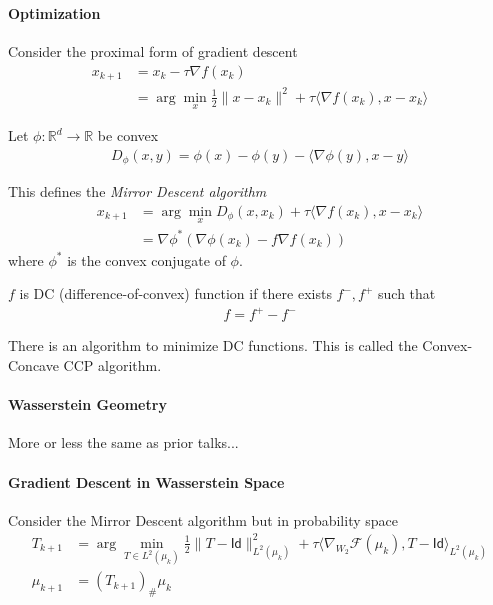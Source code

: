 \documentclass[11pt,fleqn]{article}
\numberwithin{equation}{section}
\theoremstyle{definition}
\theoremstyle{definition}
\begin{document}
\newpage
\section{}
\paragraph{Optimization}
Consider the proximal form of gradient descent
\begin{align}
	x_{k+1} & = x_k - \tau \nabla f(x_k)\\
	& = \arg \min_{x} \frac{1}{2}\|x - x_k\|^2 + \tau \langle \nabla f(x_k), x-  x_k \rangle
\end{align}

\begin{definition}
	 Let $\phi : \mathbb R^d \to \mathbb R$ be convex
	\begin{align}
		D_\phi(x,y) = \phi(x) - \phi(y) - \langle \nabla \phi(y) , x-y\rangle
	\end{align}
\end{definition}
This defines the \emph{Mirror Descent algorithm}
\begin{align}
	x_{k+1} & = \arg \min_x D_\phi(x, x_k) +\tau \langle \nabla f(x_k), x -x_k\rangle\\
	& = \nabla \phi^*(\nabla \phi(x_k) - f \nabla f(x_k))
\end{align}
where $\phi^*$ is the convex conjugate of $\phi$.

\begin{definition}
	[DC] $f$ is DC (difference-of-convex) function if there exists $f^-, f^+$ such that 
	\begin{align}
		f = f^+ - f^-
	\end{align}
\end{definition}
There is an algorithm to minimize DC functions. This is called the Convex-Concave CCP algorithm.

\paragraph{Wasserstein Geometry}
More or less the same as prior talks...

\paragraph{Gradient Descent in Wasserstein Space}
Consider the Mirror Descent algorithm but in probability space
\begin{align}
	T_{k+1} & = \arg \min_{T \in L^2(\mu_k)} \frac{1}{2}\|T -\textsf{Id}\|^2_{L^2(\mu_k)} + \tau\langle \nabla_{W_2} \mathcal F(\mu_k), T - \textsf{Id}\rangle_{L^2(\mu_k)}\\
\mu_{k+1} & = (T_{k+1})_{\#} \mu_k
\end{align}
\end{document}
